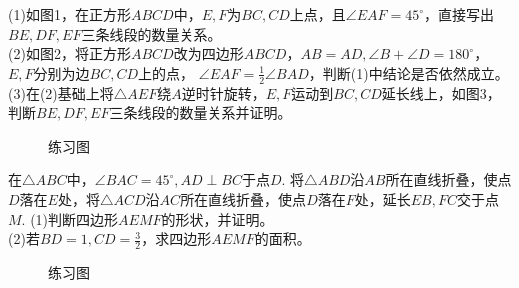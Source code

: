 \begin{problem}
(1)如图1，在正方形$ABCD$中，$E,F$为$BC,CD$上点，且$\angle EAF=45^\circ$，直接写出$BE,DF,EF$三条线段的数量关系。 \\
(2)如图2，将正方形$ABCD$改为四边形$ABCD$，$AB=AD,\angle B+\angle D=180^\circ$，$E,F$分别为边$BC,CD$上的点，
$\angle EAF=\frac{1}{2}\angle BAD$，判断(1)中结论是否依然成立。 \\
(3)在(2)基础上将$\triangle AEF$绕$A$逆时针旋转，$E,F$运动到$BC,CD$延长线上，如图3，判断$BE,DF,EF$三条线段的数量关系并证明。 \\
\end{problem}
\begin{figure}[H]
    \centering
    \resizebox{6cm}{!}{}
    \caption{练习图}
\end{figure}
\begin{problem}
在$\triangle ABC$中，$\angle BAC=45^\circ,AD\perp BC$于点$D$.
将$\triangle ABD$沿$AB$所在直线折叠，使点$D$落在$E$处，将$\triangle ACD$沿$AC$所在直线折叠，使点$D$落在$F$处，延长$EB,FC$交于点$M$.
(1)判断四边形$AEMF$的形状，并证明。\\
(2)若$BD=1,CD=\frac{3}{2}$，求四边形$AEMF$的面积。 \\
\end{problem}
\begin{figure}[H]
    \centering
    \resizebox{2.5cm}{!}{}
    \caption{练习图}
\end{figure}
\clearpage
